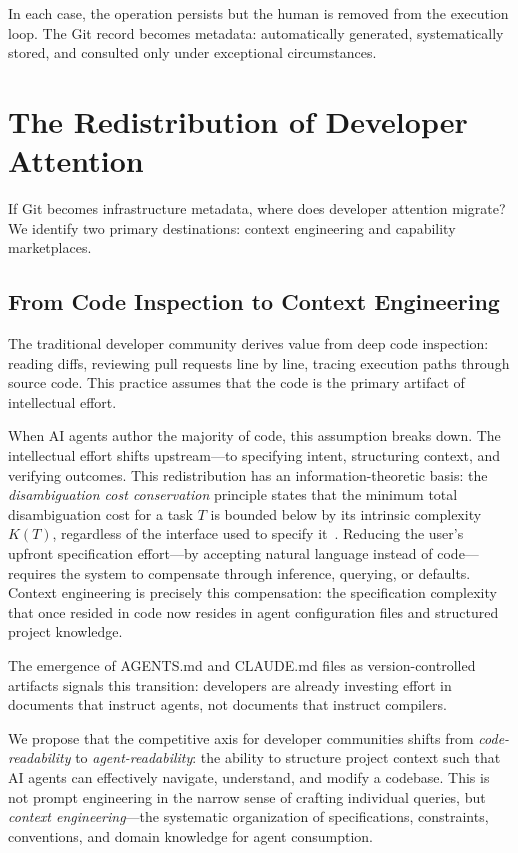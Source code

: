 \documentclass[sigconf, nonacm, anonymous=false]{acmart}
\begin{document}
In each case, the operation persists but the human is removed from the execution loop. The Git record becomes metadata: automatically generated, systematically stored, and consulted only under exceptional circumstances.

\section{The Redistribution of Developer Attention}

If Git becomes infrastructure metadata, where does developer attention migrate? We identify two primary destinations: context engineering and capability marketplaces.

\subsection{From Code Inspection to Context Engineering}

The traditional developer community derives value from deep code inspection: reading diffs, reviewing pull requests line by line, tracing execution paths through source code. This practice assumes that the code is the primary artifact of intellectual effort.

When AI agents author the majority of code, this assumption breaks down. The intellectual effort shifts upstream---to specifying intent, structuring context, and verifying outcomes. This redistribution has an information-theoretic basis: the \emph{disambiguation cost conservation} principle states that the minimum total disambiguation cost for a task $T$ is bounded below by its intrinsic complexity $K(T)$, regardless of the interface used to specify it~\citep{zgap2026chomsky}. Reducing the user's upfront specification effort---by accepting natural language instead of code---requires the system to compensate through inference, querying, or defaults. Context engineering is precisely this compensation: the specification complexity that once resided in code now resides in agent configuration files and structured project knowledge.

The emergence of AGENTS.md \citep{agentsmd2026impact} and CLAUDE.md files as version-controlled artifacts signals this transition: developers are already investing effort in documents that instruct agents, not documents that instruct compilers.

We propose that the competitive axis for developer communities shifts from \textit{code-readability} to \textit{agent-readability}: the ability to structure project context such that AI agents can effectively navigate, understand, and modify a codebase. This is not prompt engineering in the narrow sense of crafting individual queries, but \textit{context engineering}---the systematic organization of specifications, constraints, conventions, and domain knowledge for agent consumption.
\end{document}
